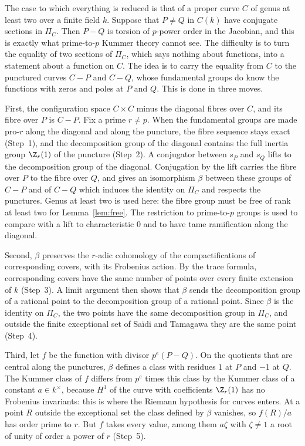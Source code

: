 The case to which everything is reduced is that of a proper curve $C$ of genus at least two over a finite field $k$. Suppose that $P\ne Q$ in $C(k)$ have conjugate sections in $\Pi_C$. Then $P-Q$ is torsion of $p$-power order in the Jacobian, and this is exactly what prime-to-$p$ Kummer theory cannot see. The difficulty is to turn the equality of two sections of $\Pi_C$, which says nothing about functions, into a statement about a function on $C$. The idea is to carry the equality from $C$ to the punctured curves $C-P$ and $C-Q$, whose fundamental groups do know the functions with zeros and poles at $P$ and $Q$. This is done in three moves.

First, the configuration space $C\times C$ minus the diagonal fibres over $C$, and its fibre over $P$ is $C-P$. Fix a prime $r\ne p$. When the fundamental groups are made pro-$r$ along the diagonal and along the puncture, the fibre sequence stays exact (Step~1), and the decomposition group of the diagonal contains the full inertia group $\Z_r(1)$ of the puncture (Step~2). A conjugator between $s_P$ and $s_Q$ lifts to the decomposition group of the diagonal. Conjugation by the lift carries the fibre over $P$ to the fibre over $Q$, and gives an isomorphism $\beta$ between these groups of $C-P$ and of $C-Q$ which induces the identity on $\Pi_C$ and respects the punctures. Genus at least two is used here: the fibre group must be free of rank at least two for Lemma~\ref{lem:free}. The restriction to prime-to-$p$ groups is used to compare with a lift to characteristic $0$ and to have tame ramification along the diagonal.

Second, $\beta$ preserves the $r$-adic cohomology of the compactifications of corresponding covers, with its Frobenius action. By the trace formula, corresponding covers have the same number of points over every finite extension of $k$ (Step~3). A limit argument then shows that $\beta$ sends the decomposition group of a rational point to the decomposition group of a rational point. Since $\beta$ is the identity on $\Pi_C$, the two points have the same decomposition group in $\Pi_C$, and outside the finite exceptional set of Sa\"idi and Tamagawa they are the same point (Step~4).

Third, let $f$ be the function with divisor $p^e(P-Q)$. On the quotients that are central along the punctures, $\beta$ defines a class with residues $1$ at $P$ and $-1$ at $Q$. The Kummer class of $f$ differs from $p^e$ times this class by the Kummer class of a constant $a\in k^\times$, because $H^1$ of the curve with coefficients $\Z_r(1)$ has no Frobenius invariants: this is where the Riemann hypothesis for curves enters. At a point $R$ outside the exceptional set the class defined by $\beta$ vanishes, so $f(R)/a$ has order prime to $r$. But $f$ takes every value, among them $a\zeta$ with $\zeta\ne1$ a root of unity of order a power of $r$ (Step~5).

